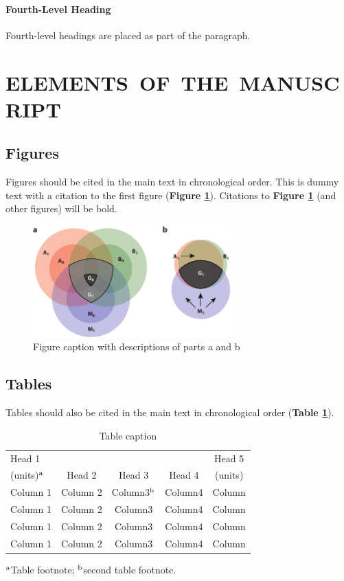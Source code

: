 \documentclass[letterpaper]{ar-1col}
\begin{document}
\paragraph{Fourth-Level Heading} Fourth-level headings are placed as part of the paragraph.

\section{ELEMENTS\ OF\ THE\ MANUSCRIPT} 
\subsection{Figures}Figures should be cited in the main text in chronological order. This is dummy text with a citation to the first figure (\textbf{Figure \ref{fig1}}). Citations to \textbf{Figure \ref{fig1}} (and other figures) will be bold. 

\begin{figure}[h]
\includegraphics[width=3in]{SampleFigure.pdf}
\caption{Figure caption with descriptions of parts a and b}
\label{fig1}
\end{figure}

\subsection{Tables} Tables should also be cited in the main text in chronological order (\textbf {Table \ref{tab1}}).

\begin{table}[h]
\caption{Table caption}
\label{tab1}
\begin{center}
\begin{tabular}{@{}l|c|c|c|c@{}}
\hline
Head 1 &&&&Head 5\\
{(}units)$^{\rm a}$ &Head 2 &Head 3 &Head 4 &{(}units)\\
\hline
Column 1 &Column 2 &Column3$^{\rm b}$ &Column4 &Column\\
Column 1 &Column 2 &Column3 &Column4 &Column\\
Column 1 &Column 2 &Column3 &Column4 &Column\\
Column 1 &Column 2 &Column3 &Column4 &Column\\
\hline
\end{tabular}
\end{center}
\begin{tabnote}
$^{\rm a}$Table footnote; $^{\rm b}$second table footnote.
\end{tabnote}
\end{table}
\end{document}
